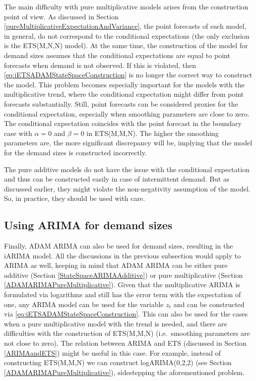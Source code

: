 \documentclass[
]{book}
\theoremstyle{definition}
\theoremstyle{definition}
\theoremstyle{definition}
\theoremstyle{definition}
\theoremstyle{remark}
\begin{document}
The main difficulty with pure multiplicative models arises from the construction point of view. As discussed in Section \ref{pureMultiplicativeExpectationAndVariance}, the point forecasts of such model, in general, do not correspond to the conditional expectations (the only exclusion is the ETS(M,N,N) model). At the same time, the construction of the model for demand sizes assumes that the conditional expectations are equal to point forecasts when demand is not observed. If this is violated, then \eqref{eq:iETSADAMStateSpaceConstruction} is no longer the correct way to construct the model. This problem becomes especially important for the models with the multiplicative trend, where the conditional expectation might differ from point forecasts substantially. Still, point forecasts can be considered proxies for the conditional expectation, especially when smoothing parameters are close to zero. The conditional expectation coincides with the point forecast in the boundary case with \(\alpha=0\) and \(\beta=0\) in ETS(M,M,N). The higher the smoothing parameters are, the more significant discrepancy will be, implying that the model for the demand sizes is constructed incorrectly.

The pure additive models do not have the issue with the conditional expectation and thus can be constructed easily in case of intermittent demand. But as discussed earlier, they might violate the non-negativity assumption of the model. So, in practice, they should be used with care.

\hypertarget{using-arima-for-demand-sizes}{%
\subsection{Using ARIMA for demand sizes}\label{using-arima-for-demand-sizes}}

Finally, ADAM ARIMA can also be used for demand sizes, resulting in the iARIMA model. All the discussions in the previous subsection would apply to ARIMA as well, keeping in mind that ADAM ARIMA can be either pure additive (Section \ref{StateSpaceARIMAAdditive}) or pure multiplicative (Section \ref{ADAMARIMAPureMultiplicative}). Given that the multiplicative ARIMA is formulated via logarithms and still has the error term with the expectation of one, any ARIMA model can be used for the variable \(z_t\) and can be constructed via \eqref{eq:iETSADAMStateSpaceConstruction}. This can also be used for the cases when a pure multiplicative model with the trend is needed, and there are difficulties with the construction of ETS(M,M,N) (i.e.~smoothing parameters are not close to zero). The relation between ARIMA and ETS (discussed in Section \ref{ARIMAandETS}) might be useful in this case. For example, instead of constructing ETS(M,M,N) we can construct logARIMA(0,2,2) (see Section \ref{ADAMARIMAPureMultiplicative}), sidestepping the aforementioned problem.
\end{document}

